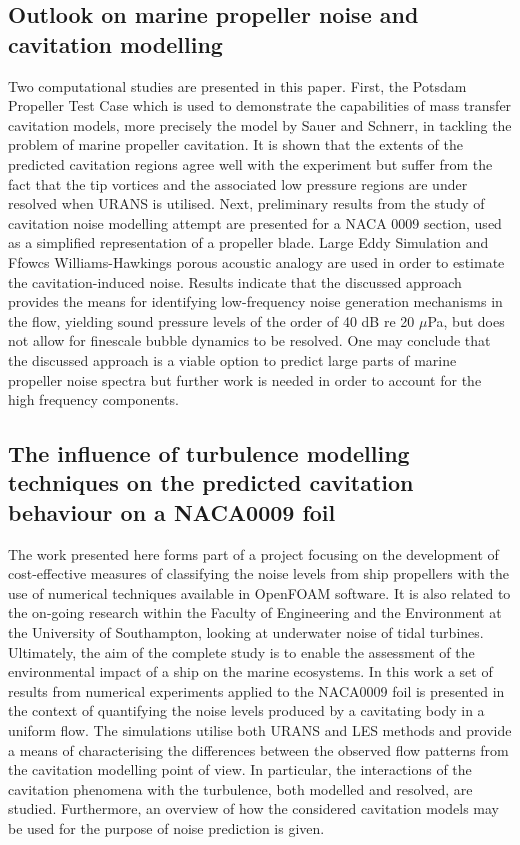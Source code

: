 \documentclass[a4paper,10pt]{article}
\begin{document}
\subsection{Outlook on marine propeller noise and cavitation modelling \cite{Lidtke2014a}}

	Two computational studies are presented in this paper. First, the Potsdam Propeller Test Case which is used to demonstrate the capabilities of mass transfer cavitation models, more precisely the model by Sauer and Schnerr, in tackling the problem of marine propeller cavitation. It is shown that the extents of the predicted cavitation regions agree well with the experiment but suffer from the fact that the tip vortices and the associated low pressure regions are under resolved when URANS is utilised. Next, preliminary results from the study of cavitation noise modelling attempt are presented for a NACA 0009 section, used as a simplified representation of a propeller blade. Large Eddy Simulation and Ffowcs Williams-Hawkings porous acoustic analogy are used in order to estimate the cavitation-induced noise. Results indicate that the discussed approach provides the means for identifying low-frequency noise generation mechanisms in the flow, yielding sound pressure levels of the order of 40 dB re 20 $\mu$Pa, but does not allow for finescale bubble dynamics to be resolved. One may conclude that the discussed approach is a viable option to predict large parts of marine propeller noise spectra but further work is needed in order to account for the high frequency components.

\subsection{The influence of turbulence modelling techniques on the predicted cavitation behaviour on a NACA0009 foil \cite{Lidtke2014}}

	The work presented here forms part of a project focusing on the development of cost-effective measures of classifying the noise levels from ship propellers with the use of numerical techniques available in OpenFOAM software. It is also related to the on-going research within the Faculty of Engineering and the Environment at the University of Southampton, looking at underwater noise of tidal turbines. Ultimately, the aim of the complete study is to enable the assessment of the environmental impact of a ship on the marine ecosystems. In this work a set of results from numerical experiments applied to the NACA0009 foil is presented in the context of quantifying the noise levels produced by a cavitating body in a uniform flow. The simulations utilise both URANS and LES methods and provide a means of characterising the differences between the observed flow patterns from the cavitation modelling point of view. In particular, the interactions of the cavitation phenomena with the turbulence, both modelled and resolved, are studied. Furthermore, an overview of how the considered cavitation models may be used for the purpose of noise prediction is given.
\end{document}
